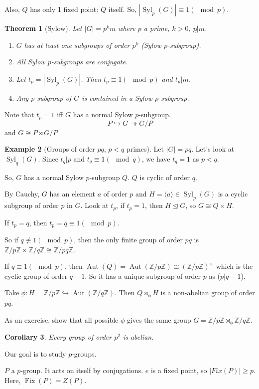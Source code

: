 \documentclass{amsart}
\newtheorem{thm}{Theorem}[section]
\newtheorem{cor}[thm]{Corollary}
\theoremstyle{definition}
\newtheorem{example}[thm]{Example}
\newcommand{\Z}{\mathbb Z}
\DeclareMathOperator{\Aut}{Aut}
\DeclareMathOperator{\Fix}{Fix}
\DeclareMathOperator{\Syl}{Syl}
\begin{document}
Also, $Q$ has only 1 fixed point: $Q$ itself. So, $|\Syl_p(G)|\equiv 1 (\mod p)$.
\begin{thm}[Sylow]
	Let $|G|=p^km$ where $p$ a prime, $k>0$, $p\not|m$.
	\begin{enumerate}
		\item $G$ has at least one subgroups of order $p^k$ (Sylow $p$-subgroup).
		\item All Sylow $p$-subgroups are conjugate.
		\item Let $t_p=|\Syl_p(G)|$. Then $t_p\equiv 1(\mod p)$ and $t_p|m$.
		\item Any $p$-subgroup of $G$ is contained in a Sylow $p$-subgroup.
	\end{enumerate}
\end{thm}
Note that $t_p=1$ iff $G$ has a normal Sylow $p$-subgroup.
$$P\hookrightarrow G\twoheadrightarrow G/P$$
and $G\cong P\rtimes G/P$
\begin{example}[Groups of order $pq$, $p<q$ primes]
	Let $|G|=pq$. Let's look at $\Syl_q(G)$. Since $t_q|p$ and $t_q\equiv 1(\mod q)$, we have $t_q=1$ as $p<q$.
	
	So, $G$ has a normal Sylow $p$-subgroup $Q$. $Q$ is cyclic of order $q$.
	
	By Cauchy, $G$ has an element $a$ of order $p$ and $H=\langle a\rangle\in\Syl_p(G)$ is a cyclic subgroup of order $p$ in $G$. Look at $t_p$, if $t_p=1$, then $H\unlhd G$, so $G\cong Q\times H$.
	
	If $t_p=q$, then $t_p=q\equiv 1(\mod p)$.
	
	So if $q\not\equiv 1(\mod p)$, then the only finite group of order $pq$ is $\Z/p\Z\times\Z/q\Z\cong\Z/pq\Z$.
	
	If $q\equiv 1(\mod p)$, then $\Aut(Q)=\Aut(\Z/p\Z)\cong (\Z/p\Z)^\times$ which is the cyclic group of order $q-1$. So it has a unique subgroup of order $p$ as ($p|q-1$).
	
	Take $\phi:H=\Z/p\Z\hookrightarrow\Aut(\Z/q\Z)$. Then $Q\rtimes_\phi H$ is a non-abelian group of order $pq$.
\end{example}

As an exercise, show that all possible $\phi$ gives the same group $G=\Z/p\Z\rtimes_\phi \Z/q\Z$.
\begin{cor}
	Every group of order $p^2$ is abelian.
\end{cor}

Our goal is to study $p$-groups.

$P$ a $p$-group. It acts on itself by conjugations. $e$ is a fixed point, so $|Fix(P)|\geq p$. Here, $\Fix(P)=Z(P)$.
\end{document}
